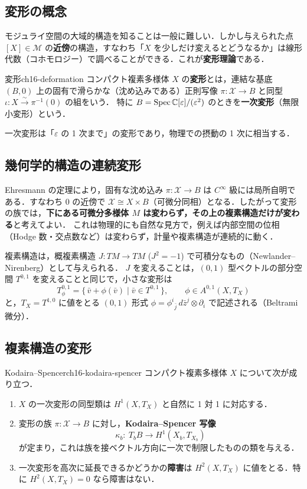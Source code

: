 \subsection{変形の概念}

モジュライ空間の大域的構造を知ることは一般に難しい．しかし与えられた点 $[X]\in\mathcal{M}$ の\textbf{近傍}の構造，すなわち「$X$ を少しだけ変えるとどうなるか」は線形代数（コホモロジー）で調べることができる．これが\textbf{変形理論}である．

\begin{mydef}{変形}{ch16-deformation}
コンパクト複素多様体 $X$ の\textbf{変形}とは，連結な基底 $(B,0)$ 上の固有で滑らかな（沈め込みである）正則写像 $\pi:\mathcal{X}\to B$ と同型 $\iota:X\xrightarrow{\sim}\pi^{-1}(0)$ の組をいう．
特に $B=\operatorname{Spec}\mathbb{C}[\varepsilon]/(\varepsilon^2)$ のときを\textbf{一次変形}（無限小変形）という．
\end{mydef}

一次変形は「$\varepsilon$ の 1 次まで」の変形であり，物理での摂動の 1 次に相当する．

\subsection{幾何学的構造の連続変形}

Ehresmann の定理により，固有な沈め込み $\pi:\mathcal{X}\to B$ は $C^\infty$ 級には局所自明である．すなわち $0$ の近傍で $\mathcal{X}\cong X\times B$（可微分同相）となる．したがって変形の族では，\textbf{下にある可微分多様体 $M$ は変わらず，その上の複素構造だけが変わる}と考えてよい．
これは物理的にも自然な見方で，例えば内部空間の位相（Hodge 数・交点数など）は変わらず，計量や複素構造が連続的に動く．

複素構造は，概複素構造 $J:TM\to TM$ ($J^2=-1$) で可積分なもの（Newlander--Nirenberg）として与えられる．
$J$ を変えることは，$(0,1)$ 型ベクトルの部分空間 $T^{0,1}$ を変えることと同じで，小さな変形は
\[
T^{0,1}_{\phi}=\{\,\bar v+\phi(\bar v)\mid \bar v\in T^{0,1}\,\},\qquad \phi\in A^{0,1}(X,T_X)
\]
と，$T_X=T^{1,0}$ に値をとる $(0,1)$ 形式 $\phi=\phi^{i}{}_{\bar j}\,d\bar z^{j}\otimes\partial_i$ で記述される（Beltrami 微分）．

\subsection{複素構造の変形}

\begin{mythm}{Kodaira--Spencer}{ch16-kodaira-spencer}
コンパクト複素多様体 $X$ について次が成り立つ．
\begin{enumerate}
\item $X$ の一次変形の同型類は $H^1(X,T_X)$ と自然に 1 対 1 に対応する．
\item 変形の族 $\pi:\mathcal{X}\to B$ に対し，\textbf{Kodaira--Spencer 写像}
\[
\kappa_b:\ T_bB\longrightarrow H^1(X_b,T_{X_b})
\]
が定まり，これは族を接ベクトル方向に一次で制限したものの類を与える．
\item 一次変形を高次に延長できるかどうかの\textbf{障害}は $H^2(X,T_X)$ に値をとる．特に $H^2(X,T_X)=0$ なら障害はない．
\end{enumerate}
\end{mythm}

